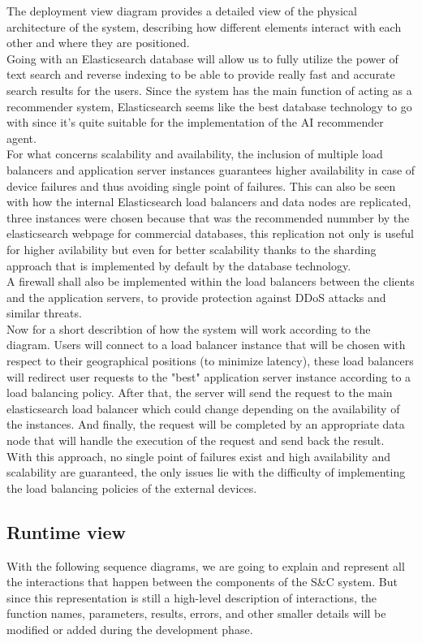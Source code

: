 \documentclass[11pt,twoside]{article}
\begin{document}
The deployment view diagram provides a detailed view of the physical architecture of the system, describing how different elements interact with each other and where they are positioned. \\
Going with an Elasticsearch database will allow us to fully utilize the power of text search and reverse indexing to be able to provide really fast and accurate search results for the users. Since the system has the main function of acting as a recommender system, Elasticsearch seems like the best database technology to go with since it's quite suitable for the implementation of the AI recommender agent. \\
For what concerns scalability and availability, the inclusion of multiple load balancers and application server instances guarantees higher availability in case of device failures and thus avoiding single point of failures. This can also be seen with how the internal Elasticsearch load balancers and data nodes are replicated, three instances were chosen because that was the recommended nummber by the elasticsearch webpage for commercial databases, this replication not only is useful for higher avilability but even for better scalability thanks to the sharding approach that is implemented by default by the database technology. \\
A firewall shall also be implemented within the load balancers between the clients and the application servers, to provide protection against DDoS attacks and similar threats. \\
Now for a short describtion of how the system will work according to the diagram. Users will connect to a load balancer instance that will be chosen with respect to their geographical positions (to minimize latency), these load balancers will redirect user requests to the "best" application server instance according to a load balancing policy. After that, the server will send the request to the main elasticsearch load balancer which could change depending on the availability of the instances. And finally, the request will be completed by an appropriate data node that will handle the execution of the request and send back the result. \\
With this approach, no single point of failures exist and high availability and scalability are guaranteed, the only issues lie with the difficulty of implementing the load balancing policies of the external devices. \\

	\subsection{Runtime view}
With the following sequence diagrams, we are going to explain and represent all the interactions that happen between the components of the S\&C system. But since this representation is still a high-level description of interactions, the function names, parameters, results, errors, and other smaller details will be modified or added during the development phase.
\end{document}
